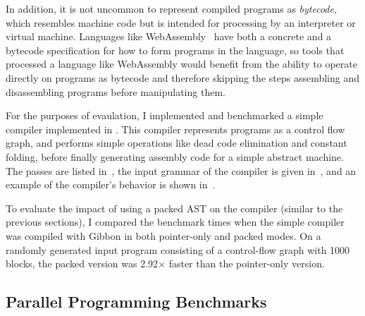 In addition,
it is not uncommon to represent compiled programs as \emph{bytecode}, which
resembles machine code but is intended for processing by an interpreter or
virtual machine. Languages like WebAssembly~\cite{webassembly} have
both a concrete and a bytecode specification for how to form programs
in the language, so tools that processed a language like WebAssembly would benefit
from the ability to operate directly on programs as bytecode and therefore
skipping the steps assembling and disassembling programs before manipulating them.

For the purposes of evaulation, I implemented and benchmarked a simple compiler
implemented in \lamadt. This compiler represents programs as a control flow graph,
and performs simple operations like dead code elimination and constant folding, before
finally generating assembly code for a simple abstract machine. The passes are listed
in~, the input grammar of the compiler is given
in~, and an example of the compiler's behavior
is shown in~.


To evaluate the impact of using a packed AST on the compiler (similar to the
previous sections), I compared the benchmark times when the simple compiler was
compiled with Gibbon in both pointer-only and packed modes. On a randomly
generated input program consisting of a control-flow graph with 1000 blocks, the
packed version was 2.92$\times$ faster than the pointer-only version.



\subsection{Parallel Programming Benchmarks}\label{subsec:parallelbench}

